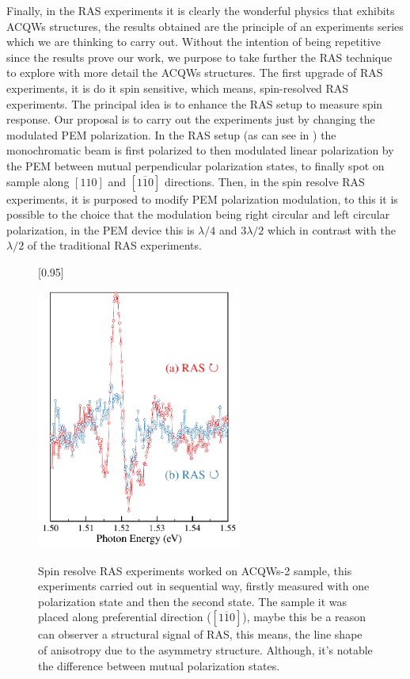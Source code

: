 Finally, in the \gls{RAS} experiments it is clearly the wonderful physics that exhibits \gls{ACQWs}
structures, the results obtained are the principle of an experiments series which we are
thinking to carry out. Without the intention of being repetitive since the results prove our work, we purpose to take further the RAS technique to explore with more detail the \gls{ACQWs} structures. The first upgrade of RAS experiments, it is do it spin sensitive, which means, spin-resolved RAS experiments.
The principal idea is to enhance the RAS setup to measure spin response. Our proposal is to carry out the experiments just by changing the modulated PEM polarization. In the RAS setup (as can see in ) the monochromatic beam is first polarized to then modulated linear polarization by the PEM between mutual perpendicular polarization states, to finally spot on sample along  $[110]$ and $[1\overline{1}0]$  directions. Then, in the spin resolve \gls{RAS} experiments, it is purposed to modify PEM polarization modulation, to this it is possible
to the choice that the modulation being right circular and left circular polarization, in the
PEM device this is $\lambda/4$ and $3\lambda/2$ which in contrast with the $\lambda/2$ of the traditional RAS
experiments.
\begin{figure}[H]
	[0.95\FBwidth]
	{ \caption{ Spin resolve RAS experiments worked on ACQWs-2 sample, this experiments carried out in sequential way, firstly measured with one polarization state and then the second state. The sample it was placed along preferential direction ($[1\overline{1}0]$), maybe this be a reason can observer a structural signal of RAS, this means, the line shape of  anisotropy due to the asymmetry structure. Although, it's notable the difference between mutual polarization states.
	}\label{fig:chapter-4-subsec-conclusion-ras-spin-1}}
	{
	\includegraphics[width=0.6\textwidth]{../figures/chapter-4/ras-spin/out/ras-spin-1.pdf}
	}
\end{figure}
